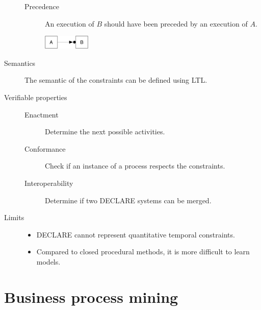 \begin{description}
\begin{description}
            \item[Precedence] 
                An execution of $B$ should have been preceded by an execution of $A$.
                \begin{center}
                    \includegraphics[width=0.2\textwidth]{img/declare_precedence.png}
                \end{center}
        \end{description}

    \item[Semantics]
        The semantic of the constraints can be defined using LTL.

    \item[Verifiable properties] \phantom{}
        \begin{description}
            \item[Enactment]  
                Determine the next possible activities.
            \item[Conformance]  
                Check if an instance of a process respects the constraints.
            \item[Interoperability]  
                Determine if two DECLARE systems can be merged.
        \end{description}

    \item[Limits] \phantom{}
        \begin{itemize}
            \item DECLARE cannot represent quantitative temporal constraints.
            \item Compared to closed procedural methods, it is more difficult to learn models.
        \end{itemize}
\end{description}



\section{Business process mining}

